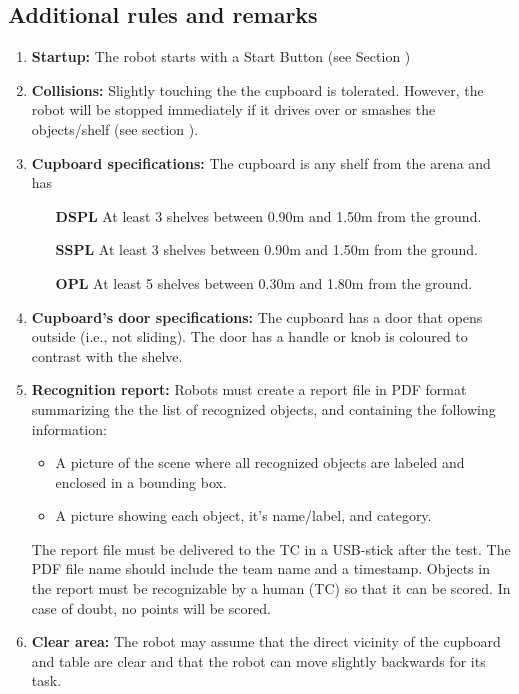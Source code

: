 \subsection{Additional rules and remarks}
\begin{enumerate}
  \item \textbf{Startup:} The robot starts with a Start Button (see Section )
  \item \textbf{Collisions:} Slightly touching the the cupboard is tolerated. However, the robot will be stopped immediately if it drives over or smashes the objects/shelf (see section ).
  \item \textbf{Cupboard specifications:} The cupboard is any shelf from the arena and has
  \begin{itemize}
    \item[\textbf{DSPL}] At least 3 shelves between 0.90m and 1.50m from the ground.
    \item[\textbf{SSPL}] At least 3 shelves between 0.90m and 1.50m from the ground.
    \item[\textbf{OPL}] At least 5 shelves between 0.30m and 1.80m from the ground.
  \end{itemize}
  \item \textbf{Cupboard's door specifications:} The cupboard has a door that opens outside (i.e., not sliding). The door has a handle or knob is coloured to contrast with the shelve.
  \item \textbf{Recognition report:} Robots must create a report file in PDF format summarizing the the list of recognized objects, and containing the following information:
  \begin{itemize}
    \item A picture of the scene where all recognized objects are labeled and enclosed in a bounding box.
    \item A picture showing each object, it's name/label, and category.
  \end{itemize}

  The report file must be delivered to the TC in a USB-stick after the test. The PDF file name should include the team name and a timestamp.  Objects in the report must be recognizable by a human (TC) so that it can be scored. In case of doubt, no points will be scored.
  \item \textbf{Clear area: } The robot may assume that the direct vicinity of the cupboard and table are clear and that the robot can move slightly backwards for its task. 
\end{enumerate}

